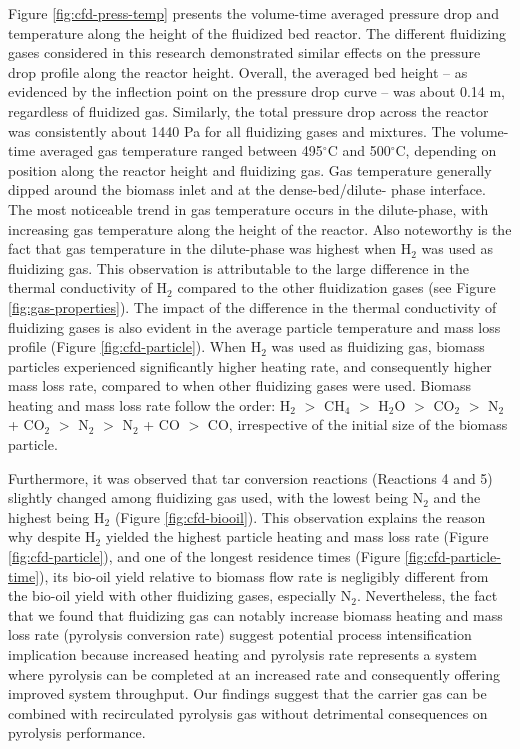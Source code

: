 Figure \ref{fig:cfd-press-temp} presents the volume-time averaged pressure drop and temperature along the height of the fluidized bed reactor. The different fluidizing gases considered in this research demonstrated similar effects on the pressure drop profile along the reactor height. Overall, the averaged bed height – as evidenced by the inflection point on the pressure drop curve – was about 0.14 m, regardless of fluidized gas. Similarly, the total pressure drop across the reactor was consistently about 1440 Pa for all fluidizing gases and mixtures. The volume-time averaged gas temperature ranged between 495$^\circ$C and 500$^\circ$C, depending on position along the reactor height and fluidizing gas. Gas temperature generally dipped around the biomass inlet and at the dense-bed/dilute- phase interface. The most noticeable trend in gas temperature occurs in the dilute-phase, with increasing gas temperature along the height of the reactor. Also noteworthy is the fact that gas temperature in the dilute-phase was highest when H$_2$ was used as fluidizing gas. This observation is attributable to the large difference in the thermal conductivity of H$_2$ compared to the other fluidization gases (see Figure \ref{fig:gas-properties}). The impact of the difference in the thermal conductivity of fluidizing gases is also evident in the average particle temperature and mass loss profile (Figure \ref{fig:cfd-particle}). When H$_2$ was used as fluidizing gas, biomass particles experienced significantly higher heating rate, and consequently higher mass loss rate, compared to when other fluidizing gases were used. Biomass heating and mass loss rate follow the order: H$_2$ $>$ CH$_4$ $>$ H$_2$O $>$ CO$_2$ $>$ N$_2$ + CO$_2$ $>$ N$_2$ $>$ N$_2$ + CO $>$ CO, irrespective of the initial size of the biomass particle.

Furthermore, it was observed that tar conversion reactions (Reactions 4 and 5) slightly changed among fluidizing gas used, with the lowest being N$_2$ and the highest being H$_2$ (Figure \ref{fig:cfd-biooil}). This observation explains the reason why despite H$_2$ yielded the highest particle heating and mass loss rate (Figure \ref{fig:cfd-particle}), and one of the longest residence times (Figure \ref{fig:cfd-particle-time}), its bio-oil yield relative to biomass flow rate is negligibly different from the bio-oil yield with other fluidizing gases, especially N$_2$. Nevertheless, the fact that we found that fluidizing gas can notably increase biomass heating and mass loss rate (pyrolysis conversion rate) suggest potential process intensification implication because increased heating and pyrolysis rate represents a system where pyrolysis can be completed at an increased rate and consequently offering improved system throughput. Our findings suggest that the carrier gas can be combined with recirculated pyrolysis gas without detrimental consequences on pyrolysis performance.

